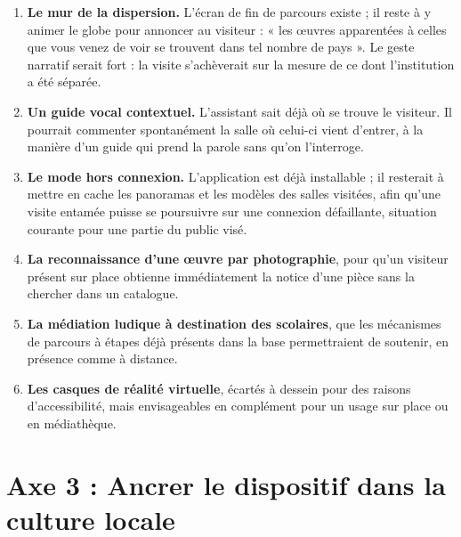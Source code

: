 \begin{enumerate}
  \item \textbf{Le mur de la dispersion.} L'écran de fin de parcours existe ;
        il reste à y animer le globe pour annoncer au visiteur : « les œuvres
        apparentées à celles que vous venez de voir se trouvent dans tel nombre
        de pays ». Le geste narratif serait fort : la visite s'achèverait sur la
        mesure de ce dont l'institution a été séparée.

  \item \textbf{Un guide vocal contextuel.} L'assistant sait déjà où se trouve
        le visiteur. Il pourrait commenter spontanément la salle où celui-ci
        vient d'entrer, à la manière d'un guide qui prend la parole sans qu'on
        l'interroge.

  \item \textbf{Le mode hors connexion.} L'application est déjà installable ; il
        resterait à mettre en cache les panoramas et les modèles des salles
        visitées, afin qu'une visite entamée puisse se poursuivre sur une
        connexion défaillante, situation courante pour une partie du public
        visé.

  \item \textbf{La reconnaissance d'une œuvre par photographie}, pour qu'un
        visiteur présent sur place obtienne immédiatement la notice d'une pièce
        sans la chercher dans un catalogue.

  \item \textbf{La médiation ludique à destination des scolaires}, que les
        mécanismes de parcours à étapes déjà présents dans la base
        permettraient de soutenir, en présence comme à distance.

  \item \textbf{Les casques de réalité virtuelle}, écartés à dessein pour des
        raisons d'accessibilité, mais envisageables en complément pour un usage
        sur place ou en médiathèque.
\end{enumerate}

\section*{Axe 3 : Ancrer le dispositif dans la culture locale}

